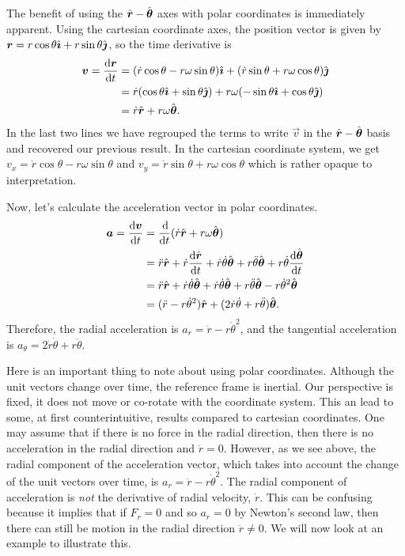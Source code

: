 \documentclass[../classical_mechanics.tex]{subfiles}
\begin{document}
            The benefit of using the $\hat{\boldsymbol{r}}-\hat{\boldsymbol{\theta}}$ axes with polar coordinates is immediately apparent.
            Using the cartesian coordinate axes, the position vector is given by $\boldsymbol{r}=r\cos\theta\hat{\boldsymbol{\imath}}+r\sin\theta\hat{\boldsymbol{\jmath}}$, so the time derivative is
            \begin{align}
                \vec{v}=\dv{\vec{r}}{t}&=(\dot{r}\cos\theta-r\omega\sin\theta)\ihat+(\dot{r}\sin\theta+r\omega\cos\theta)\jhat\label{eq:2d-polar-velocity-cartesian}\\
                &=\dot{r}(\cos\theta\ihat+\sin\theta\jhat)+r\omega(-\sin\theta\ihat+\cos\theta\jhat)\\
                &=\dot{r}\uvec{r}+r\omega\uvec{\theta}.
            \end{align}
            In the last two lines we have regrouped the terms to write $\vec{v}$ in the $\hat{\boldsymbol{r}}-\hat{\boldsymbol{\theta}}$ basis and recovered our previous result.
            In the cartesian coordinate system, we get $v_x=\dot{r}\cos\theta-r\omega\sin\theta$ and $v_y=\dot{r}\sin\theta+r\omega\cos\theta$ which is rather opaque to interpretation.

            Now, let's calculate the acceleration vector in polar coordinates.
            \begin{align}
                \vec{a}=\dv{\vec{v}}{t}&=\dv{}{t}(\dot{r}\uvec{r}+r\omega\uvec{\theta})\\
                &=\ddot{r}\uvec{r}+\dot{r}\dv{\uvec{r}}{t}+\dot{r}\dot{\theta}\uvec{\theta}+r\ddot{\theta}\uvec{\theta}+r\dot{\theta}\dv{\uvec{\theta}}{t}\\
                &=\ddot{r}\uvec{r}+\dot{r}\dot{\theta}\uvec{\theta}+\dot{r}\dot{\theta}\uvec{\theta}+r\ddot{\theta}\uvec{\theta}-r\dot{\theta}^2\uvec{\theta}\\
                &=(\ddot{r}-r\dot{\theta}^2)\uvec{r}+(2\dot{r}\dot{\theta}+r\ddot{\theta})\uvec{\theta}.\label{eq:2d-polar-acceleration}
            \end{align}
            Therefore, the radial acceleration is $a_r=\ddot{r}-r\dot{\theta}^2$, and the tangential acceleration is $a_\theta= 2\dot{r}\dot{\theta}+r\ddot{\theta}$.

            Here is an important thing to note about using polar coordinates.
            Although the unit vectors change over time, the reference frame is inertial.
            Our perspective is fixed, it does not move or co-rotate with the coordinate system.
            This an lead to some, at first counterintuitive, results compared to cartesian coordinates.
            One may assume that if there is no force in the radial direction, then there is no acceleration in the radial direction and $\ddot{r}=0$.
            However, as we see above, the radial component of the acceleration vector, which takes into account the change of the unit vectors over time, is $a_r=\ddot{r}-r\dot{\theta}^2$.
            The radial component of acceleration is \textit{not} the derivative of radial velocity, $\dot{r}$.
            This can be confusing because it implies that if $F_r=0$ and so $a_r=0$ by Newton's second law, then there can still be motion in the radial direction $\ddot{r}\neq0$.
            We will now look at an example to illustrate this.
\end{document}
